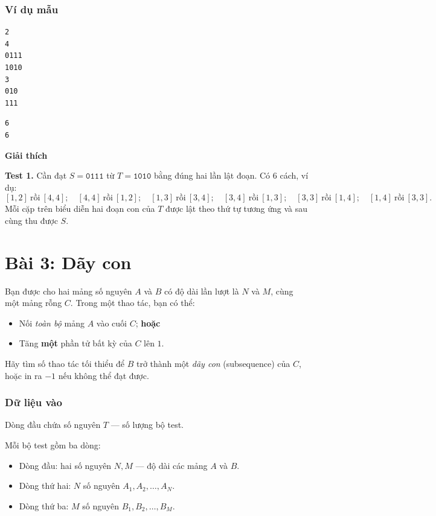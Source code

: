 \subsubsection*{Ví dụ mẫu}

\begin{tcolorbox}[title=Input]
\begin{verbatim}
2
4
0111
1010
3
010
111
\end{verbatim}
\end{tcolorbox}

\begin{tcolorbox}[title=Output]
\begin{verbatim}
6
6
\end{verbatim}
\end{tcolorbox}

\textbf{Giải thích}

\textbf{Test 1.} Cần đạt $S=\texttt{0111}$ từ $T=\texttt{1010}$ bằng đúng hai lần lật đoạn. Có 6 cách, ví dụ:
\[
[1,2]\ \text{rồi}\ [4,4];\quad
[4,4]\ \text{rồi}\ [1,2];\quad
[1,3]\ \text{rồi}\ [3,4];\quad
[3,4]\ \text{rồi}\ [1,3];\quad
[3,3]\ \text{rồi}\ [1,4];\quad
[1,4]\ \text{rồi}\ [3,3].
\]
Mỗi cặp trên biểu diễn hai đoạn con của $T$ được lật theo thứ tự tương ứng và sau cùng thu được $S$.

\newpage

\section*{Bài 3: Dãy con}

Bạn được cho hai mảng số nguyên $A$ và $B$ có độ dài lần lượt là $N$ và $M$, cùng một mảng rỗng $C$. Trong một thao tác, bạn có thể:
\begin{itemize}
  \item Nối \emph{toàn bộ} mảng $A$ vào cuối $C$; \textbf{hoặc}
  \item Tăng \textbf{một} phần tử bất kỳ của $C$ lên $1$.
\end{itemize}
Hãy tìm số thao tác tối thiểu để $B$ trở thành một \textit{dãy con} (subsequence) của $C$, hoặc in ra $-1$ nếu không thể đạt được.

\subsubsection*{Dữ liệu vào}
Dòng đầu chứa số nguyên $T$ — số lượng bộ test.  

Mỗi bộ test gồm ba dòng:
\begin{itemize}
  \item Dòng đầu: hai số nguyên $N, M$ — độ dài các mảng $A$ và $B$.
  \item Dòng thứ hai: $N$ số nguyên $A_1, A_2, \ldots, A_N$.
  \item Dòng thứ ba: $M$ số nguyên $B_1, B_2, \ldots, B_M$.
\end{itemize}


